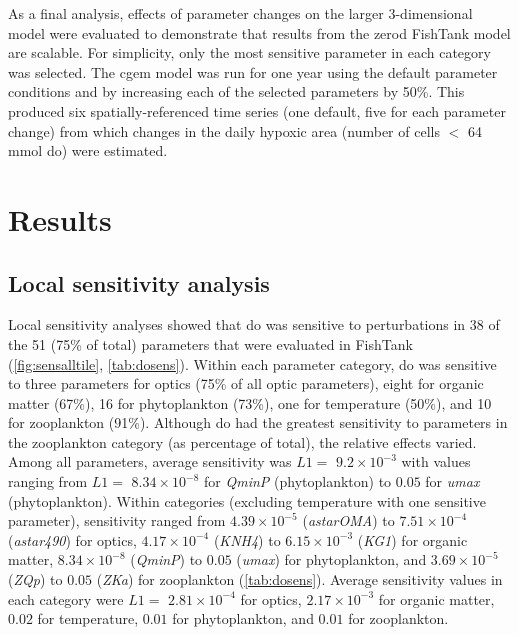 \documentclass[preprint]{elsarticle}\usepackage[]{graphicx}\usepackage[]{color}
\begin{document}
As a final analysis, effects of parameter changes on the larger 3-dimensional model were evaluated to demonstrate that results from the \ac{zerod} FishTank model are scalable.  For simplicity, only the most sensitive parameter in each category was selected.  The \ac{cgem} model was run for one year using the default parameter conditions and by increasing each of the selected parameters by 50\%.  This produced six spatially-referenced time series (one default, five for each parameter change) from which changes in the daily hypoxic area (number of cells $<$ 64 mmol \ac{do}) were estimated.

\section{Results}


 
\subsection{Local sensitivity analysis}

Local sensitivity analyses showed that \ac{do} was sensitive to perturbations in 38 of the 51 (75\% of total) parameters that were evaluated in FishTank (\cref{fig:sensalltile}, \cref{tab:dosens}). Within each parameter category, \ac{do} was sensitive to three parameters for optics (75\% of all optic parameters), eight for organic matter (67\%), 16 for phytoplankton (73\%), one for temperature (50\%), and 10 for zooplankton (91\%). Although \ac{do} had the greatest sensitivity to parameters in the zooplankton category (as percentage of total), the relative effects varied. Among all parameters, average sensitivity was $L1 = $ $9.2\times 10^{-3}$ with values ranging from $L1 = $ $8.34\times 10^{-8}$ for \textit{QminP} (phytoplankton) to $0.05$ for \textit{umax} (phytoplankton). Within categories (excluding temperature with one sensitive parameter), sensitivity ranged from $4.39\times 10^{-5}$ (\textit{astarOMA}) to $7.51\times 10^{-4}$ (\textit{astar490}) for optics, $4.17\times 10^{-4}$ (\textit{KNH4}) to $6.15\times 10^{-3}$ (\textit{KG1}) for organic matter, $8.34\times 10^{-8}$ (\textit{QminP}) to $0.05$ (\textit{umax}) for phytoplankton, and $3.69\times 10^{-5}$ (\textit{ZQp}) to $0.05$ (\textit{ZKa}) for zooplankton (\cref{tab:dosens}).  Average sensitivity values in each category were $L1 = $ $2.81\times 10^{-4}$ for optics, $2.17\times 10^{-3}$ for organic matter, $0.02$ for temperature, $0.01$ for phytoplankton, and $0.01$ for zooplankton.
\end{document}
